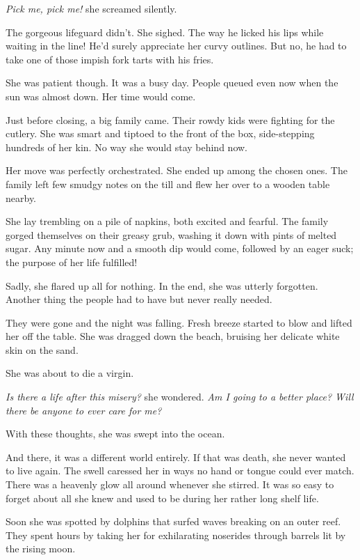 \emph{Pick me, pick me!} she screamed silently.

The gorgeous lifeguard didn't. She sighed. The way he licked his lips while waiting in the line! He'd surely appreciate her curvy outlines. But no, he had to take one of those impish fork tarts with his fries.

She was patient though. It was a busy day. People queued even now when the sun was almost down. Her time would come.

Just before closing, a big family came. Their rowdy kids were fighting for the cutlery. She was smart and tiptoed to the front of the box, side-stepping hundreds of her kin. No way she would stay behind now.

Her move was perfectly orchestrated. She ended up among the chosen ones. The family left few smudgy notes on the till and flew her over to a wooden table nearby.

She lay trembling on a pile of napkins, both excited and fearful. The family gorged themselves on their greasy grub, washing it down with pints of melted sugar. Any minute now and a smooth dip would come, followed by an eager suck; the purpose of her life fulfilled!

Sadly, she flared up all for nothing. In the end, she was utterly forgotten. Another thing the people had to have but never really needed.

\vspace{0.5cm}

They were gone and the night was falling. Fresh breeze started to blow and lifted her off the table. She was dragged down the beach, bruising her delicate white skin on the sand.

She was about to die a virgin.

\emph{Is there a life after this misery?} she wondered. \emph{Am I going to a better place? Will there be anyone to ever care for me?}

With these thoughts, she was swept into the ocean.

And there, it was a different world entirely. If that was death, she never wanted to live again. The swell caressed her in ways no hand or tongue could ever match. There was a heavenly glow all around whenever she stirred. It was so easy to forget about all she knew and used to be during her rather long shelf life.

Soon she was spotted by dolphins that surfed waves breaking on an outer reef. They spent hours by taking her for exhilarating noserides through barrels lit by the rising moon.

